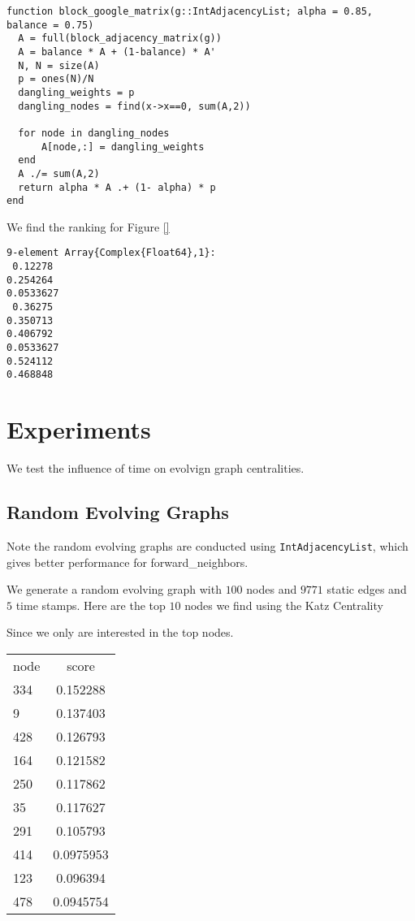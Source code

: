 \documentclass[12pt]{article}
\theoremstyle{definition}
\begin{document}
\begin{lstlisting}
function block_google_matrix(g::IntAdjacencyList; alpha = 0.85, balance = 0.75)
  A = full(block_adjacency_matrix(g))
  A = balance * A + (1-balance) * A'
  N, N = size(A)
  p = ones(N)/N
  dangling_weights = p
  dangling_nodes = find(x->x==0, sum(A,2))

  for node in dangling_nodes
      A[node,:] = dangling_weights
  end
  A ./= sum(A,2)
  return alpha * A .+ (1- alpha) * p
end
\end{lstlisting}

We find the ranking for Figure \ref{}

\begin{lstlisting}
9-element Array{Complex{Float64},1}:
 0.12278
0.254264
0.0533627
 0.36275
0.350713
0.406792
0.0533627
0.524112
0.468848
\end{lstlisting}

\section{Experiments}
\label{sec:experiments}

We test the influence of time on evolvign graph centralities.

\subsection{Random Evolving Graphs}
\label{sec:random}

Note the random evolving graphs are conducted using \texttt{IntAdjacencyList}, which gives better performance for
forward\_neighbors.

We generate a random evolving graph with $100$ nodes and $9771$ static edges and $5$ time stamps.
Here are the top $10$ nodes we find using the Katz Centrality

Since we only are interested in the top nodes.

\begin{tabular}{ l | c }
  \hline
  node & score \\
  334 & 0.152288 \\
  9 & 0.137403 \\
  428 & 0.126793 \\
  164 & 0.121582 \\
  250 & 0.117862 \\
  35 & 0.117627 \\
  291 & 0.105793 \\
  414 & 0.0975953 \\
  123 & 0.096394 \\
  478 & 0.0945754 \\
  \hline
\end{tabular}
\end{document}
